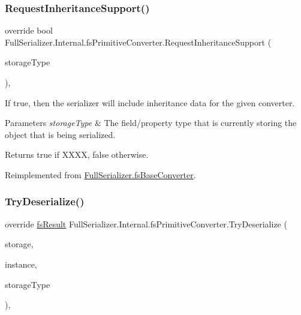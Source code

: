 \subsubsection{\texorpdfstring{Request\+Inheritance\+Support()}{RequestInheritanceSupport()}}
{\footnotesize\ttfamily override bool Full\+Serializer.\+Internal.\+fs\+Primitive\+Converter.\+Request\+Inheritance\+Support (\begin{DoxyParamCaption}\item[{Type}]{storage\+Type }\end{DoxyParamCaption})\hspace{0.3cm}{\ttfamily [inline]}, {\ttfamily [virtual]}}



If true, then the serializer will include inheritance data for the given converter. 


\begin{DoxyParams}{Parameters}
{\em storage\+Type} & The field/property type that is currently storing the object that is being serialized.\\
\hline
\end{DoxyParams}
\begin{DoxyReturn}{Returns}
{\ttfamily true} if X\+X\+XX, {\ttfamily false} otherwise.
\end{DoxyReturn}


Reimplemented from \hyperlink{class_full_serializer_1_1fs_base_converter_a84447285540ab6b51efc2399d144c60c}{Full\+Serializer.\+fs\+Base\+Converter}.

\mbox{\label{class_full_serializer_1_1_internal_1_1fs_primitive_converter_a5143547d92eb9578d027c0a676ad0613}} 
\subsubsection{\texorpdfstring{Try\+Deserialize()}{TryDeserialize()}}
{\footnotesize\ttfamily override \hyperlink{struct_full_serializer_1_1fs_result}{fs\+Result} Full\+Serializer.\+Internal.\+fs\+Primitive\+Converter.\+Try\+Deserialize (\begin{DoxyParamCaption}\item[{\hyperlink{class_full_serializer_1_1fs_data}{fs\+Data}}]{storage,  }\item[{ref object}]{instance,  }\item[{Type}]{storage\+Type }\end{DoxyParamCaption})\hspace{0.3cm}{\ttfamily [inline]}, {\ttfamily [virtual]}}



